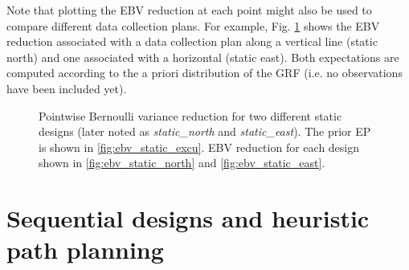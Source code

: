 \documentclass[aoas]{imsart}
\begin{document}
Note that plotting the EBV reduction at each point might also be used
to compare different data collection plans. For example,
Fig. \ref{fig:ebv_north_vs_east} shows the EBV reduction associated
with a data collection plan along a vertical line (static north) and
one associated with a horizontal (static east). Both expectations are
computed according to the a priori distribution of the GRF (i.e. no
observations have been included yet).


\begin{figure}[ht] 
\centering 
{}
\caption{Pointwise Bernoulli variance reduction for two different static designs (later noted as \textit{static\_north} and \textit{static\_east}). The prior EP is shown in
  \ref{fig:ebv_static_excu}. EBV reduction for each design shown in
  \ref{fig:ebv_static_north} and \ref{fig:ebv_static_east}.}
\label{fig:ebv_north_vs_east}
\end{figure}


\section{Sequential designs and heuristic path planning}
\label{sec:heuristics}
\end{document}
